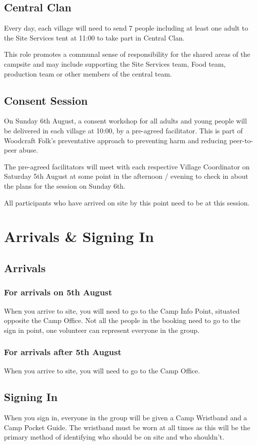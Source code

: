 \documentclass[a4paper, 11pt]{report}
\begin{document}
\section{Central Clan}
Every day, each village will need to send 7 people including at least one adult to the Site Services tent at 11:00 to take part in Central Clan.\nl

This role promotes a communal sense of responsibility for the shared areas of the campsite and may include supporting the Site Services team, Food team, production team or other members of the central team.

\section{Consent Session}
On Sunday 6th August, a consent workshop for all adults and young people will be delivered in each village at 10:00, by a pre-agreed facilitator. This is part of Woodcraft Folk's preventative approach to preventing harm and reducing peer-to-peer abuse. \nl

The pre-agreed facilitators will meet with each respective Village Coordinator on Saturday 5th August at some point in the afternoon / evening to check in about the plans for the session on Sunday 6th. \nl

All participants who have arrived on site by this point need to be at this session. 

\chapter{Arrivals \& Signing In}
\section{Arrivals}
\subsection{For arrivals on 5th August}
When you arrive to site, you will need to go to the Camp Info Point, situated opposite the Camp Office. Not all the people in the booking need to go to the sign in point, one volunteer can represent everyone in the group. 
\subsection{For arrivals after 5th August}
When you arrive to site, you will need to go to the Camp Office.
\section{Signing In}
When you sign in, everyone in the group will be given a Camp Wristband and a Camp Pocket Guide. The wristband must be worn at all times as this will be the primary method of identifying who should be on site and who shouldn't.\nl
\end{document}
